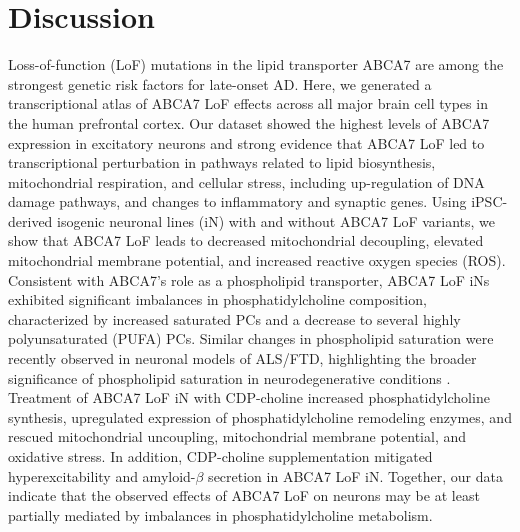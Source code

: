 \documentclass[12pt]{article}
\begin{document}
\section{Discussion}
\label{sec:discussion}
Loss-of-function (LoF) mutations in the lipid transporter ABCA7 are among the strongest genetic risk factors for late-onset AD. Here, we generated a transcriptional atlas of ABCA7 LoF effects across all major brain cell types in the human prefrontal cortex. Our dataset showed the highest levels of ABCA7 expression in excitatory neurons and strong evidence that ABCA7 LoF led to transcriptional perturbation in pathways related to lipid biosynthesis, mitochondrial respiration, and cellular stress, including up-regulation of DNA damage pathways, and changes to inflammatory and synaptic genes. Using iPSC-derived isogenic neuronal lines (iN) with and without ABCA7 LoF variants, we show that ABCA7 LoF leads to decreased mitochondrial decoupling, elevated mitochondrial membrane potential, and increased reactive oxygen species (ROS). Consistent with ABCA7’s role as a phospholipid transporter, ABCA7 LoF iNs exhibited significant imbalances in phosphatidylcholine composition, characterized by increased saturated PCs and a decrease to several highly polyunsaturated (PUFA) PCs. Similar changes in phospholipid saturation were recently observed in neuronal models of ALS/FTD, highlighting the broader significance of phospholipid saturation in neurodegenerative conditions \cite{Giblin2025-ri}. Treatment of ABCA7 LoF iN with CDP-choline increased phosphatidylcholine synthesis, upregulated expression of phosphatidylcholine remodeling enzymes, and rescued mitochondrial uncoupling, mitochondrial membrane potential, and oxidative stress. In addition, CDP-choline supplementation mitigated hyperexcitability and amyloid-$\beta$ secretion in ABCA7 LoF iN. Together, our data indicate that the observed effects of ABCA7 LoF on neurons may be at least partially mediated by imbalances in phosphatidylcholine metabolism. 
\end{document}
